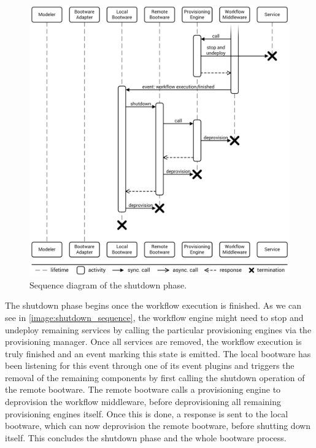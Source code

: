 \begin{figure}[!htbp]
	\centering
	\includegraphics[resolution=600]{process/assets/shutdown_sequence}
	\caption{Sequence diagram of the shutdown phase.}
	\label{image:shutdown_sequence}
\end{figure}

The shutdown phase begins once the workflow execution is finished.
As we can see in \autoref{image:shutdown_sequence}, the workflow engine might need to stop and undeploy remaining services by calling the particular provisioning engines via the provisioning manager.
Once all services are removed, the workflow execution is truly finished and an event marking this state is emitted.
The local bootware has been listening for this event through one of its event plugins and triggers the removal of the remaining components by first calling the shutdown operation of the remote bootware.
The remote bootware calls a provisioning engine to deprovision the workflow middleware, before deprovisioning all remaining provisioning engines itself.
Once this is done, a response is sent to the local bootware, which can now deprovision the remote bootware, before shutting down itself.
This concludes the shutdown phase and the whole bootware process.
